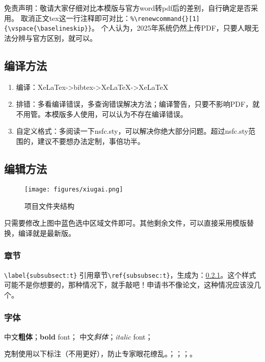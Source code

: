 
免责声明：敬请大家仔细对比本模版与官方word转pdf后的差别，自行确定是否采用。
取消正文tex这一行注释即可对比：\verb|%\renewcommand{}[1]|\\
\verb|{\vspace{\baselineskip}}|。
个人认为，2025年系统仍然上传PDF，只要人眼无法分辨与官方区别，就可以。

\subsection{编译方法}
\begin{enumerate}
	\item 编译：XeLaTex->bibtex->XeLaTeX->XeLaTeX
	\item 排错：多看编译错误，多查询错误解决方法；编译警告，只要不影响PDF，就不用管。本模版多人使用，可以认为不存在编译错误。
	\item 自定义格式：多阅读一下nsfc.sty，可以解决你绝大部分问题。超过nsfc.sty范围的，建议不要想办法定制，事倍功半。
\end{enumerate}


\subsection{编辑方法}
\vspace{-5pt}

\begin{figure}[h!]
	\centering %
	\texttt{[image: figures/xiugai.png]}
	\captionsetup{justification=centering} %
	\caption{项目文件夹结构}
\end{figure}
只需要修改上图中蓝色选中区域文件即可。其他剩余文件，可以直接采用模版替换，编译就是最新版。

\subsubsection{章节}\label{subsubsec:t}
\verb|\label{subsubsect:t}|
引用章节\verb|\ref{subsubsec:t}|，生成为：\ref{subsubsec:t}。这个样式可能不是你想要的，那种情况下，就手敲吧！申请书不像论文，这种情况应该没几个。

\subsubsection{字体}
中文\textbf{粗体}；\textbf{bold} font；
中文\textit{斜体}；\textit{italic} font；

克制使用以下标注（不用更好），防止专家眼花缭乱。；；；。

